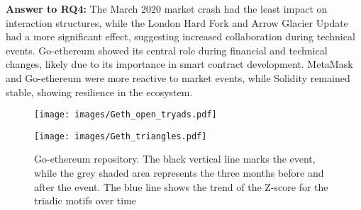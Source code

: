 \begin{tcolorbox}[right=0.1cm,left=0.1cm,top=0.1cm,bottom=0.1cm]
\textbf{Answer to RQ4:} The March 2020 market crash had the least impact on interaction structures, while the London Hard Fork and Arrow Glacier Update had a more significant effect, suggesting increased collaboration during technical events. Go-ethereum showed its central role during financial and technical changes, likely due to its importance in smart contract development. MetaMask and Go-ethereum were more reactive to market events, while Solidity remained stable, showing resilience in the ecosystem.
\end{tcolorbox}

\begin{figure}[h]
    \begin{minipage}{0.5\textwidth}
        \centering \texttt{[image: images/Geth\_open\_tryads.pdf]} \label{fig: geth open tryads}
    \end{minipage}%
    \hspace{0.05\textwidth}
    \begin{minipage}{0.5\textwidth}
        \centering \texttt{[image: images/Geth\_triangles.pdf]} \label{fig: geth triangles}
    \end{minipage}
    \caption{Go-ethereum repository. The black vertical line marks the event, while the grey shaded area represents the three months before and after the event. The blue line shows the trend of the Z-score for the triadic motifs over time} \label{fig: geth triadic motifs}
\end{figure}